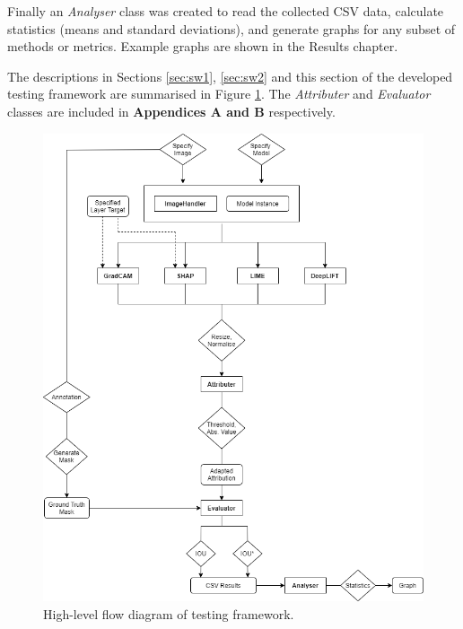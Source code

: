 \documentclass[main]{subfiles}
\begin{document}
Finally an \textit{Analyser} class was created to read the collected CSV data, calculate statistics (means and standard deviations), and generate graphs for any subset of methods or metrics. Example graphs are shown in the Results chapter.

The descriptions in Sections \ref{sec:sw1}, \ref{sec:sw2} and this section of the developed testing framework are summarised in Figure \ref{flow_image}. The \textit{Attributer} and \textit{Evaluator} classes are included in \textbf{Appendices A and B} respectively.


\begin{figure}[htbp]
\centering
\includegraphics[scale=0.6]{program_flow.png}
\caption{High-level flow diagram of testing framework.}
\label{flow_image}
\end{figure}
\end{document}
